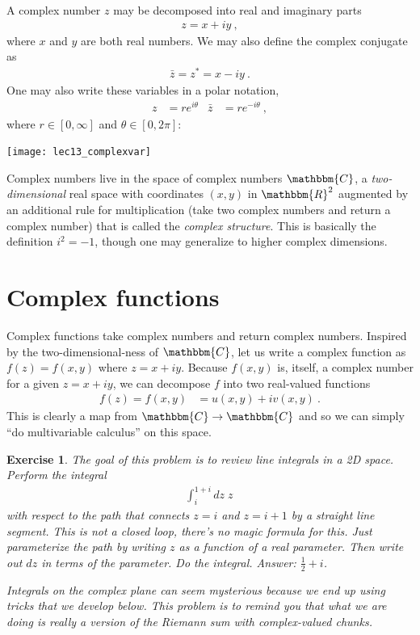 \documentclass[
  11pt,
	colorful,
	raggedright,
]{tufte-style-thesis-flip}
\newtheorem{exercise}{Exercise}[section]
\begin{document}
A complex number $z$ may be decomposed into real and imaginary parts
\begin{align}
  z = x + i y \ ,
\end{align}
where $x$ and $y$ are both real numbers. We may also define the complex conjugate as
\begin{align}
  \bar z = z^* = x - i y \ .
\end{align}
One may also write these variables in a polar notation,
\begin{align}
  z &= re^{i\theta}
  &
  \bar z &= re^{-i\theta} \ ,
\end{align}
where $r \in [0,\infty]$ and $\theta \in [0, 2\pi]$:
\begin{center}
\texttt{[image: lec13\_complexvar]}
\end{center}
Complex numbers live in the space of complex numbers $\mathbbm{C}$, a \emph{two-dimensional} real space with coordinates $(x,y)$ in $\mathbbm{R}^2$ augmented by an additional rule for multiplication (take two complex numbers and return a complex number) that is called the \emph{complex structure}. This is basically the definition $i^2 = -1$, though one may generalize to higher complex dimensions. 

\section{Complex functions}

Complex functions take complex numbers and return complex numbers. Inspired by the two-dimensional-ness of $\mathbbm{C}$, let us write a complex function as $f(z)=f(x,y)$ where $z = x+i y$. Because $f(x,y)$ is, itself, a complex number for a given $z=x+i y$, we can decompose $f$ into two real-valued functions
\begin{align}
  f(z) = f(x,y) &= u(x,y) + i v(x,y) \ .
\end{align}
This is clearly a map from $\mathbbm{C} \to \mathbbm{C}$ and so we can simply ``do multivariable calculus'' on this space. 

\begin{exercise}
The goal of this problem is to review line integrals in a 2D space. Perform the integral
\begin{align}
  \int_i^{1+i} dz \; z \,
\end{align}
with respect to the path that connects $z=i$ and $z=i+1$ by a straight line segment. This is \emph{not} a closed loop, there's no magic formula for this. Just parameterize the path by writing $z$ as a function of a real parameter. Then write out $dz$ in terms of the parameter. Do the integral. Answer: $\frac{1}{2}+i$.

 Integrals on the complex plane can seem mysterious because we end up using tricks that we develop below. This problem is to remind you that what we are doing is really a version of the Riemann sum with complex-valued chunks. 
\end{exercise}
\end{document}
